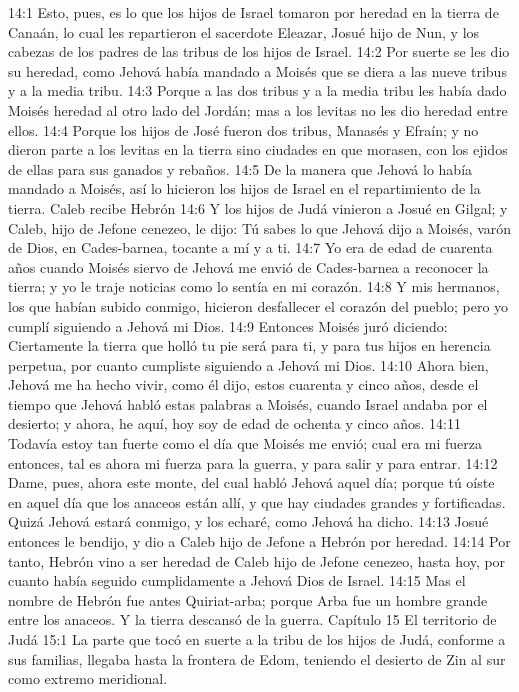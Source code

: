 14:1 Esto, pues, es lo que los hijos de Israel tomaron por heredad en la tierra de Canaán, lo cual les repartieron el sacerdote Eleazar, Josué hijo de Nun, y los cabezas de los padres de las tribus de los hijos de Israel.  
14:2 Por suerte se les dio su heredad, como Jehová había mandado a Moisés que se diera a las nueve tribus y a la media tribu. 
14:3 Porque a las dos tribus y a la media tribu les había dado Moisés heredad al otro lado del Jordán; mas a los levitas no les dio heredad entre ellos.  
14:4 Porque los hijos de José fueron dos tribus, Manasés y Efraín; y no dieron parte a los levitas en la tierra sino ciudades en que morasen, con los ejidos de ellas para sus ganados y rebaños.  
14:5 De la manera que Jehová lo había mandado a Moisés, así lo hicieron los hijos de Israel en el repartimiento de la tierra.  
Caleb recibe Hebrón  
14:6 Y los hijos de Judá vinieron a Josué en Gilgal; y Caleb, hijo de Jefone cenezeo, le dijo: Tú sabes lo que Jehová dijo a Moisés, varón de Dios, en Cades-barnea, tocante a mí y a ti. 
14:7 Yo era de edad de cuarenta años cuando Moisés siervo de Jehová me envió de Cades-barnea a reconocer la tierra; y yo le traje noticias como lo sentía en mi corazón. 
14:8 Y mis hermanos, los que habían subido conmigo, hicieron desfallecer el corazón del pueblo; pero yo cumplí siguiendo a Jehová mi Dios.  
14:9 Entonces Moisés juró diciendo: Ciertamente la tierra que holló tu pie será para ti, y para tus hijos en herencia perpetua, por cuanto cumpliste siguiendo a Jehová mi Dios. 
14:10 Ahora bien, Jehová me ha hecho vivir, como él dijo, estos cuarenta y cinco años, desde el tiempo que Jehová habló estas palabras a Moisés, cuando Israel andaba por el desierto; y ahora, he aquí, hoy soy de edad de ochenta y cinco años.  
14:11 Todavía estoy tan fuerte como el día que Moisés me envió; cual era mi fuerza entonces, tal es ahora mi fuerza para la guerra, y para salir y para entrar.  
14:12 Dame, pues, ahora este monte, del cual habló Jehová aquel día; porque tú oíste en aquel día que los anaceos están allí, y que hay ciudades grandes y fortificadas. Quizá Jehová estará conmigo, y los echaré, como Jehová ha dicho.  
14:13 Josué entonces le bendijo, y dio a Caleb hijo de Jefone a Hebrón por heredad.  
14:14 Por tanto, Hebrón vino a ser heredad de Caleb hijo de Jefone cenezeo, hasta hoy, por cuanto había seguido cumplidamente a Jehová Dios de Israel.  
14:15 Mas el nombre de Hebrón fue antes Quiriat-arba; porque Arba fue un hombre grande entre los anaceos. Y la tierra descansó de la guerra.  
Capítulo 15 
El territorio de Judá  
15:1 La parte que tocó en suerte a la tribu de los hijos de Judá, conforme a sus familias, llegaba hasta la frontera de Edom, teniendo el desierto de Zin al sur como extremo meridional.  

